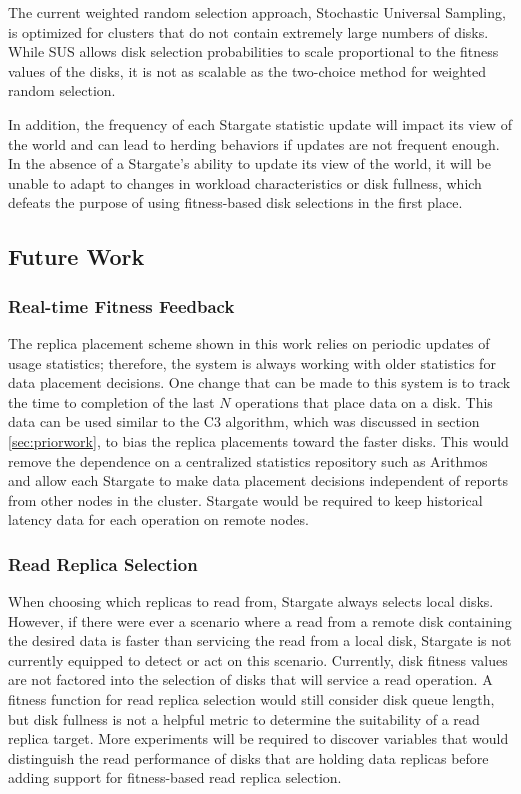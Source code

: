 \documentclass[12pt]{article}
\begin{document}
  The current weighted random selection approach, Stochastic Universal
  Sampling, is optimized for clusters that do not contain extremely large
  numbers of disks. While SUS allows disk selection probabilities to scale
  proportional to the fitness values of the disks, it is not as scalable as the
  two-choice method for weighted random selection.

  In addition, the frequency of each Stargate statistic update will impact its view
  of the world and can lead to herding behaviors if updates are not frequent
  enough. In the absence of a Stargate's ability to update its view of the
  world, it will be unable to adapt to changes in workload characteristics or
  disk fullness, which defeats the purpose of using fitness-based disk
  selections in the first place.

  \subsection{Future Work}

    \subsubsection{Real-time Fitness Feedback}

    The replica placement scheme shown in this work relies on periodic updates
    of usage statistics; therefore, the system is always working with older
    statistics for data placement decisions. One change that can be made to this
    system is to track the time to completion of the last $N$ operations that
    place data on a disk. This data can be used similar to the C3 algorithm,
    which was discussed in section \ref{sec:priorwork}, to bias the replica placements
    toward the faster disks. This would remove the dependence on a centralized
    statistics repository such as Arithmos and allow each Stargate to make data
    placement decisions independent of reports from other nodes in the cluster.
    Stargate would be required to keep historical latency data for each
    operation on remote nodes.

    \subsubsection{Read Replica Selection}

    When choosing which replicas to read from, Stargate always selects local
    disks. However, if there were ever a scenario where a read from a remote
    disk containing the desired data is faster than servicing the read from a
    local disk, Stargate is not currently equipped to detect or act on this
    scenario. Currently, disk fitness values are not factored into the selection
    of disks that will service a read operation. A fitness function for read
    replica selection would still consider disk queue length, but disk fullness
    is not a helpful metric to determine the suitability of a read replica
    target. More experiments will be required to discover variables that would
    distinguish the read performance of disks that are holding data replicas before
    adding support for fitness-based read replica selection.
    
\end{document}
